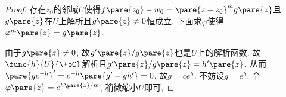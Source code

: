\documentclass[../ComplexVariable.tex]{subfiles}
\begin{document}
\begin{proof}
    存在$z_0$的邻域$U$使得$f\pare{z_0} - w_0 = \pare{z-z_0}^m g\pare{z}$且$g\pare{z}$在$U$上解析且$g\pare{z} \neq 0$恒成立. 下面求$\varphi$使得$\varphi^m\pare{z} = g\pare{z}$.
    \par
    由于$g\pare{z}\neq 0$, 故$g'\pare{z}/g\pare{z}$也是$U$上的解析函数. 故$\func{h}{U}{\+bC}$解析且$g'\pare{z}/g\pare{z} = h'\pare{z}$. 从而$\pare{ge^{-h}}' = e^{-h}\pare{g'-gh'} = 0$. 故$g=ce^{h}$. 不妨设$g = e^h$. 令$\varphi\pare{z} = e^{h\pare{z}/m}$, 稍微缩小$U$即可,
\end{proof}


\end{document}

